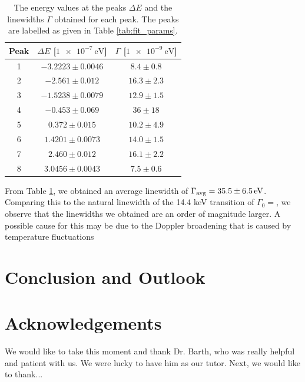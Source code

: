 \documentclass[a4paper]{report}
\numberwithin{equation}{section}
\begin{document}
\begin{table}[!ht]
    \centering
    \begin{tabular}{|c|c|c|}
    \hline  
        Peak & $\Delta E$ [$\SI{1e-7}{\electronvolt}$] & $\Gamma$ [$\SI{1e-9}{\electronvolt}$] \\ \hline
        1 &$-3.2223 \pm 0.0046$ & $8.4 \pm 0.8 $\\ \hline
        2 &$-2.561 \pm 0.012$ &   $16.3 \pm 2.3$ \\ \hline
        3 &$-1.5238 \pm 0.0079$ & $12.9 \pm 1.5$ \\ \hline
        4 &$-0.453 \pm 0.069$ &   $36 \pm 18 $ \\ \hline
        5 &$ 0.372 \pm 0.015$ &   $10.2 \pm 4.9$ \\ \hline
        6 &$ 1.4201 \pm 0.0073$ & $14.0 \pm 1.5$ \\ \hline
        7 &$ 2.460 \pm 0.012$ &   $16.1 \pm 2.2$ \\ \hline
        8 &$ 3.0456 \pm 0.0043$ & $7.5 \pm 0.6 $\\ \hline
    \end{tabular}
    \caption{The energy values at the peaks $\Delta E$ and the linewidths $\Gamma$ obtained for each peak. The peaks are 
    labelled as given in Table \ref{tab:fit_params}.}
\label{tab:energy_params}
\end{table}

From Table \ref{tab:energy_params}, we obtained an average linewidth of $\Gamma_{\mathrm{avg}} = \SI{35.5 \pm 6.5}{\electronvolt}$. 
Comparing this to the natural linewidth of the 14.4 keV transition of $\Gamma_0 =$, we observe that the linewidths we obtained are an 
order of magnitude larger. A possible cause for this may be due to the Doppler broadening that is caused by temperature fluctuations


\chapter{Conclusion and Outlook}

\chapter{Acknowledgements}
We would like to take this moment and thank Dr. Barth, who was really helpful and patient with us. We were lucky to have him as our tutor. Next, we would like to thank...
\end{document}
